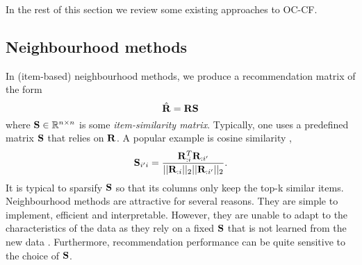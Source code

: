 In the rest of this section we review some existing approaches to OC-CF.
%
\subsection{Neighbourhood methods}
\label{sec:knn}

In (item-based) neighbourhood methods, we produce a recommendation matrix of the form
\begin{equation}
\label{eqn:knn}
\hat{\mathbf{R}} = \mathbf{R} \mathbf{S}
\end{equation}
where $\mathbf{S} \in \mathbb{R}^{n \times n}$ is some \emph{item-similarity matrix}.
Typically, one uses a predefined matrix $\mathbf{S}$ that relies on $\mathbf{R}$. A popular example is cosine similarity \citep{Sarwar:2001, Linden:2003},
$$ \mathbf{S}_{i' i} = \frac{ \mathbf{R}_{:i}^T \mathbf{R}_{:i'} }{|| \mathbf{R}_{:i} ||_2 || \mathbf{R}_{:i'} ||_2}. $$
It is typical to sparsify $\mathbf{S}$ so that its columns only keep the top-k similar items.
Neighbourhood methods are attractive for several reasons.
They are simple to implement, efficient
and interpretable.
However, they are unable to adapt to the characteristics of the data as they rely on a fixed $\mathbf{S}$ that is not learned from the new data \citep{Koren:2008b}. Furthermore, recommendation performance can be quite sensitive to the choice of $\mathbf{S}$.

